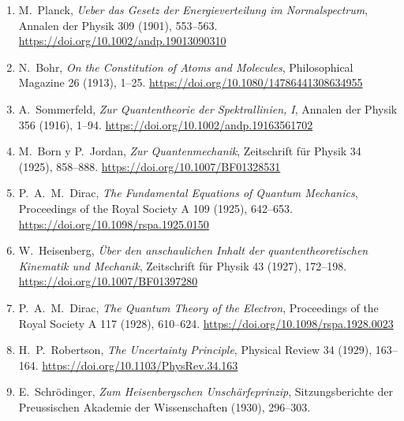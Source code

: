 \begin{enumerate}
\renewcommand{\labelenumi}{[\arabic{enumi}]}
\item\hypertarget{radionbib:Planck1901}{}
M.~Planck,
\emph{Ueber das Gesetz der Energieverteilung im Normalspectrum},
Annalen der Physik 309 (1901), 553--563.
\url{https://doi.org/10.1002/andp.19013090310}

\item\hypertarget{radionbib:Bohr1913}{}
N.~Bohr,
\emph{On the Constitution of Atoms and Molecules},
Philosophical Magazine 26 (1913), 1--25.
\url{https://doi.org/10.1080/14786441308634955}

\item\hypertarget{radionbib:Sommerfeld1916}{}
A.~Sommerfeld,
\emph{Zur Quantentheorie der Spektrallinien, I},
Annalen der Physik 356 (1916), 1--94.
\url{https://doi.org/10.1002/andp.19163561702}

\item\hypertarget{radionbib:BornJordan1925}{}
M.~Born y P.~Jordan,
\emph{Zur Quantenmechanik},
Zeitschrift für Physik 34 (1925), 858--888.
\url{https://doi.org/10.1007/BF01328531}

\item\hypertarget{radionbib:Dirac1925}{}
P.~A.~M.~Dirac,
\emph{The Fundamental Equations of Quantum Mechanics},
Proceedings of the Royal Society A 109 (1925), 642--653.
\url{https://doi.org/10.1098/rspa.1925.0150}

\item\hypertarget{radionbib:Heisenberg1927}{}
W.~Heisenberg,
\emph{Über den anschaulichen Inhalt der quantentheoretischen Kinematik und Mechanik},
Zeitschrift für Physik 43 (1927), 172--198.
\url{https://doi.org/10.1007/BF01397280}

\item\hypertarget{radionbib:Dirac1928}{}
P.~A.~M.~Dirac,
\emph{The Quantum Theory of the Electron},
Proceedings of the Royal Society A 117 (1928), 610--624.
\url{https://doi.org/10.1098/rspa.1928.0023}

\item\hypertarget{radionbib:Robertson1929}{}
H.~P.~Robertson,
\emph{The Uncertainty Principle},
Physical Review 34 (1929), 163--164.
\url{https://doi.org/10.1103/PhysRev.34.163}

\item\hypertarget{radionbib:Schrodinger1930}{}
E.~Schrödinger,
\emph{Zum Heisenbergschen Unschärfeprinzip},
Sitzungsberichte der Preussischen Akademie der Wissenschaften (1930), 296--303.


\end{enumerate}
